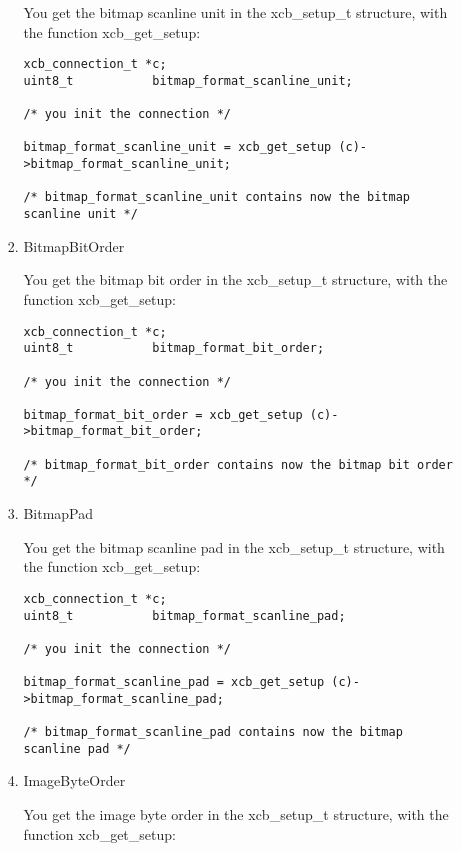 \documentclass[12pt,oneside,titlepage]{book}
\begin{document}
\begin{enumerate}
\begin{enumerate}
\begin{enumerate}
      You get the bitmap scanline unit in the {xcb\_setup\_t} structure,
      with the function {xcb\_get\_setup}:

\begin{verbatim}
xcb_connection_t *c;
uint8_t           bitmap_format_scanline_unit;

/* you init the connection */

bitmap_format_scanline_unit = xcb_get_setup (c)->bitmap_format_scanline_unit;

/* bitmap_format_scanline_unit contains now the bitmap scanline unit */
\end{verbatim}
    \item
      \protect\hypertarget{BitmapBitOrder}{}{}BitmapBitOrder

      You get the bitmap bit order in the {xcb\_setup\_t} structure,
      with the function {xcb\_get\_setup}:

\begin{verbatim}
xcb_connection_t *c;
uint8_t           bitmap_format_bit_order;

/* you init the connection */

bitmap_format_bit_order = xcb_get_setup (c)->bitmap_format_bit_order;

/* bitmap_format_bit_order contains now the bitmap bit order */
\end{verbatim}
    \item
      \protect\hypertarget{BitmapPad}{}{}BitmapPad

      You get the bitmap scanline pad in the {xcb\_setup\_t} structure,
      with the function {xcb\_get\_setup}:

\begin{verbatim}
xcb_connection_t *c;
uint8_t           bitmap_format_scanline_pad;

/* you init the connection */

bitmap_format_scanline_pad = xcb_get_setup (c)->bitmap_format_scanline_pad;

/* bitmap_format_scanline_pad contains now the bitmap scanline pad */
\end{verbatim}
    \item
      \protect\hypertarget{ImageByteOrder}{}{}ImageByteOrder

      You get the image byte order in the {xcb\_setup\_t} structure,
      with the function {xcb\_get\_setup}:


\end{enumerate}
\end{enumerate}
\end{enumerate}
\end{document}
